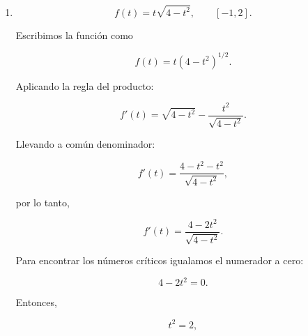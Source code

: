 \documentclass[12pt]{article}
\begin{document}
\begin{enumerate}[label=\alph*.-]
\begin{enumerate}[label=\roman*.-]
    \[
    f'(x)
    =
    \frac{1-x^2}{(x^2-x+1)^2}.
    \]

    Los números críticos se obtienen de

    \[
    1-x^2=0,
    \]

    por lo que

    \[
    x=\pm1.
    \]

    Como el intervalo es $[0,3]$, solamente consideramos

    \[
    x=1.
    \]

    Evaluamos en los extremos y en el número crítico:

    \[
    f(0)=0,
    \]

    \[
    f(1)=1,
    \]

    \[
    f(3)
    =
    \frac{3}{9-3+1}
    =
    \frac37.
    \]

    Como

    \[
    1>\frac37>0,
    \]

    obtenemos:

    \[
    \boxed{
    \text{Máximo absoluto: }(1,1)
    }
    \]

    y

    \[
    \boxed{
    \text{Mínimo absoluto: }(0,0)
    }.
    \]



    \item
    \[
    f(t)=t\sqrt{4-t^2},
    \qquad [-1,2].
    \]

    Escribimos la función como

    \[
    f(t)=t(4-t^2)^{1/2}.
    \]

    Aplicando la regla del producto:

    \[
    f'(t)
    =
    \sqrt{4-t^2}
    -
    \frac{t^2}{\sqrt{4-t^2}}.
    \]

    Llevando a común denominador:

    \[
    f'(t)
    =
    \frac{4-t^2-t^2}{\sqrt{4-t^2}},
    \]

    por lo tanto,

    \[
    \boxed{
    f'(t)=
    \frac{4-2t^2}{\sqrt{4-t^2}}
    }.
    \]

    Para encontrar los números críticos igualamos el numerador a cero:

    \[
    4-2t^2=0.
    \]

    Entonces,

    \[
    t^2=2,
    \]


\end{enumerate}
\end{enumerate}
\end{document}
